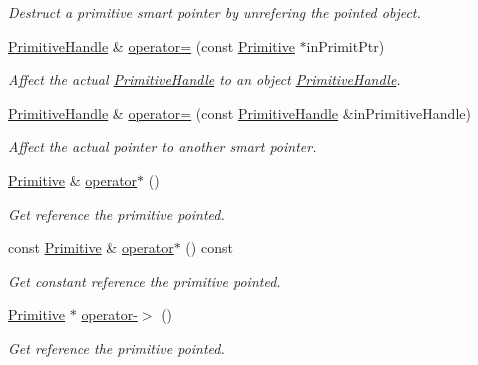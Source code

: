 \begin{DoxyCompactItemize}
\begin{DoxyCompactList}\small\item\em Destruct a primitive smart pointer by unrefering the pointed object. \end{DoxyCompactList}\item 
\hyperlink{classPuppy_1_1PrimitiveHandle}{Primitive\+Handle} \& \hyperlink{classPuppy_1_1PrimitiveHandle_a1aaf940a337bebe97f80aa4d7fe9d451}{operator=} (const \hyperlink{classPuppy_1_1Primitive}{Primitive} $\ast$in\+Primit\+Ptr)
\begin{DoxyCompactList}\small\item\em Affect the actual \hyperlink{classPuppy_1_1PrimitiveHandle}{Primitive\+Handle} to an object \hyperlink{classPuppy_1_1PrimitiveHandle}{Primitive\+Handle}. \end{DoxyCompactList}\item 
\hyperlink{classPuppy_1_1PrimitiveHandle}{Primitive\+Handle} \& \hyperlink{classPuppy_1_1PrimitiveHandle_ad35a2449566fb91ff70feca52cc9a738}{operator=} (const \hyperlink{classPuppy_1_1PrimitiveHandle}{Primitive\+Handle} \&in\+Primitive\+Handle)
\begin{DoxyCompactList}\small\item\em Affect the actual pointer to another smart pointer. \end{DoxyCompactList}\item 
\hyperlink{classPuppy_1_1Primitive}{Primitive} \& \hyperlink{classPuppy_1_1PrimitiveHandle_ada654223700c4b57e63a338804ac3c9f}{operator$\ast$} ()
\begin{DoxyCompactList}\small\item\em Get reference the primitive pointed. \end{DoxyCompactList}\item 
const \hyperlink{classPuppy_1_1Primitive}{Primitive} \& \hyperlink{classPuppy_1_1PrimitiveHandle_a265e0c2a791fd2deef5b543f5ccc2e44}{operator$\ast$} () const 
\begin{DoxyCompactList}\small\item\em Get constant reference the primitive pointed. \end{DoxyCompactList}\item 
\hyperlink{classPuppy_1_1Primitive}{Primitive} $\ast$ \hyperlink{classPuppy_1_1PrimitiveHandle_a64dbf49fabd8c7cd499ed44d1c77c718}{operator-\/$>$} ()
\begin{DoxyCompactList}\small\item\em Get reference the primitive pointed. \end{DoxyCompactList}\item 

\end{DoxyCompactItemize}
